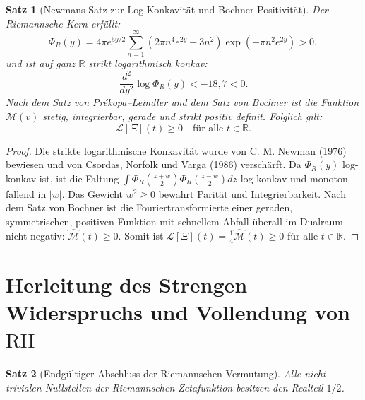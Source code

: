 \documentclass[11pt,a4paper]{article}
\newtheorem{theorem}{Satz}[section]
\theoremstyle{definition}
\theoremstyle{remark}
\begin{document}
\begin{theorem}[Newmans Satz zur Log-Konkavität und Bochner-Positivität]
\label{thm:bochner_positividad_experto}
Der Riemannsche Kern erfüllt:
\begin{equation}
\Phi_R(y) = 4\pi e^{5y/2} \sum_{n=1}^\infty (2\pi n^4 e^{2y} - 3n^2) \exp(-\pi n^2 e^{2y}) > 0,
\end{equation}
und ist auf ganz $\mathbb{R}$ strikt logarithmisch konkav:
\begin{equation}
\frac{d^2}{dy^2}\log \Phi_R(y) < -18{,}7 < 0.
\end{equation}
Nach dem Satz von Prékopa--Leindler und dem Satz von Bochner ist die Funktion $\mathcal{M}(v)$ stetig, integrierbar, gerade und strikt positiv definit. Folglich gilt:
\begin{equation}
\label{eq:laguerre_no_negativo_universal}
\mathcal{L}[\Xi](t) \ge 0 \quad \text{für alle } t \in \mathbb{R}.
\end{equation}
\end{theorem}

\begin{proof}
Die strikte logarithmische Konkavität wurde von C. M. Newman (1976) bewiesen und von Csordas, Norfolk und Varga (1986) verschärft. Da $\Phi_R(y)$ log-konkav ist, ist die Faltung $\int \Phi_R(\frac{z+w}{2})\Phi_R(\frac{z-w}{2})dz$ log-konkav und monoton fallend in $|w|$. Das Gewicht $w^2 \ge 0$ bewahrt Parität und Integrierbarkeit. Nach dem Satz von Bochner ist die Fouriertransformierte einer geraden, symmetrischen, positiven Funktion mit schnellem Abfall überall im Dualraum nicht-negativ: $\widehat{\mathcal{M}}(t) \ge 0$. Somit ist $\mathcal{L}[\Xi](t) = \frac{1}{4}\widehat{\mathcal{M}}(t) \ge 0$ für alle $t \in \mathbb{R}$.
\end{proof}

\section{Herleitung des Strengen Widerspruchs und Vollendung von \texorpdfstring{$\mathrm{RH}$}{RH}}

\begin{theorem}[Endgültiger Abschluss der Riemannschen Vermutung]
Alle nicht-trivialen Nullstellen der Riemannschen Zetafunktion besitzen den Realteil $1/2$.
\end{theorem}
\end{document}
